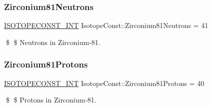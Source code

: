 \subsubsection{\texorpdfstring{Zirconium81\+Neutrons}{Zirconium81Neutrons}}
{\footnotesize\ttfamily \mbox{\hyperlink{group___isotope_const-_macros_ga5f18360b3e99483a35c32d789e62621c}{I\+S\+O\+T\+O\+P\+E\+C\+O\+N\+S\+T\+\_\+\+I\+NT}} Isotope\+Const\+::\+Zirconium81\+Neutrons = 41}

\$ \$ Neutrons in Zirconium-\/81. \mbox{\label{group___isotope_const-_zirconium-_zr81_ga01cccd4a427f9da628d40f61dea578a7}} 
\subsubsection{\texorpdfstring{Zirconium81\+Protons}{Zirconium81Protons}}
{\footnotesize\ttfamily \mbox{\hyperlink{group___isotope_const-_macros_ga5f18360b3e99483a35c32d789e62621c}{I\+S\+O\+T\+O\+P\+E\+C\+O\+N\+S\+T\+\_\+\+I\+NT}} Isotope\+Const\+::\+Zirconium81\+Protons = 40}

\$ \$ Protons in Zirconium-\/81. 